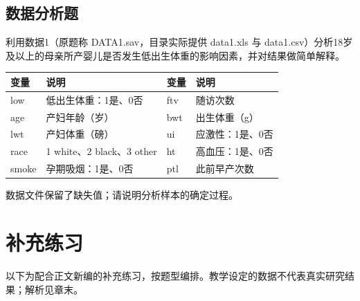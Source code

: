 \par\addvspace{8pt}\noindent\begin{minipage}{\linewidth}

\subsection{数据分析题}


利用数据1（原题称 DATA1.sav，目录实际提供 data1.xls 与 data1.csv）分析18岁及以上的母亲所产婴儿是否发生低出生体重的影响因素，并对结果做简单解释。

\begin{center}\small\setlength{\tabcolsep}{4pt}\renewcommand{\arraystretch}{1.22}\begin{tabular}{@{}llll@{}}
\toprule
变量 & 说明 & 变量 & 说明 \\
\midrule

low & 低出生体重：1是、0否 & ftv & 随访次数 \\
age & 产妇年龄（岁） & bwt & 出生体重（g） \\
lwt & 产妇体重（磅） & ui & 应激性：1是、0否 \\
race & 1 white、2 black、3 other & ht & 高血压：1是、0否 \\
smoke & 孕期吸烟：1是、0否 & ptl & 此前早产次数 \\
\bottomrule\end{tabular}\end{center}

数据文件保留了缺失值；请说明分析样本的确定过程。



\end{minipage}\par\vspace{5pt}


\clearpage\section{补充练习}

\begin{keyidea}[说明]以下为配合正文新编的补充练习，按题型编排。教学设定的数据不代表真实研究结果；解析见章末。\end{keyidea}


